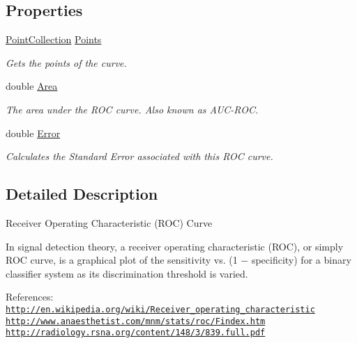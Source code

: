 \subsection*{Properties}
\begin{DoxyCompactItemize}
\item 
\hyperlink{class_crowdsourcing_project_1_1_statistics_1_1_receiver_operating_characteristic_1_1_point_collection}{Point\+Collection} \hyperlink{class_crowdsourcing_project_1_1_statistics_1_1_receiver_operating_characteristic_a0684231949d27fe15a40af511cedfa1e}{Points}
\begin{DoxyCompactList}\small\item\em Gets the points of the curve. \end{DoxyCompactList}\item 
double \hyperlink{class_crowdsourcing_project_1_1_statistics_1_1_receiver_operating_characteristic_ac7cd3193e58dddd982b54b39a3284e1f}{Area}
\begin{DoxyCompactList}\small\item\em The area under the R\+O\+C curve. Also known as A\+U\+C-\/\+R\+O\+C. \end{DoxyCompactList}\item 
double \hyperlink{class_crowdsourcing_project_1_1_statistics_1_1_receiver_operating_characteristic_a122e8eb0e99a3b298f7370736114511a}{Error}
\begin{DoxyCompactList}\small\item\em Calculates the Standard Error associated with this R\+O\+C curve. \end{DoxyCompactList}\end{DoxyCompactItemize}


\subsection{Detailed Description}
Receiver Operating Characteristic (R\+O\+C) Curve 

In signal detection theory, a receiver operating characteristic (R\+O\+C), or simply R\+O\+C curve, is a graphical plot of the sensitivity vs. (1 − specificity) for a binary classifier system as its discrimination threshold is varied.

References\+: \href{http://en.wikipedia.org/wiki/Receiver_operating_characteristic}{\tt http\+://en.\+wikipedia.\+org/wiki/\+Receiver\+\_\+operating\+\_\+characteristic} \href{http://www.anaesthetist.com/mnm/stats/roc/Findex.htm}{\tt http\+://www.\+anaesthetist.\+com/mnm/stats/roc/\+Findex.\+htm} \href{http://radiology.rsna.org/content/148/3/839.full.pdf}{\tt http\+://radiology.\+rsna.\+org/content/148/3/839.\+full.\+pdf} 

